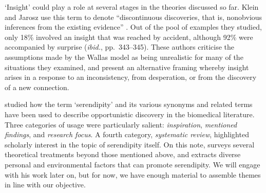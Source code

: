 `Insight' could play a role at several stages in the theories
discussed so far.  Klein and Jarosz use this term to denote
``discontinuous discoveries, that is, nonobvious inferences from the
existing evidence'' \cite[p.~335]{Klein2011}.  Out of the pool of
examples they studied, only 18\% involved an insight that was reached
by accident, although 92\% were accompanied by surprise (\emph{ibid.},
pp.~343--345).  These authors criticise the assumptions made by the
Wallas model as being unrealistic for many of the situations they
examined, and present an alternative framing whereby insight arises in
a response to an inconsistency, from desperation, or from the
discovery of a new connection.

\citet{Allen:2013:LOD:2655780.2655790} studied how the term
`serendipity' and its various synonyms and related terms have been
used to describe opportunistic discovery in the biomedical literature.
Three categories of usage were particularly salient:
\emph{inspiration}, \emph{mentioned findings}, and \emph{research
  focus}.  A fourth category, \emph{systematic review}, highlighted
scholarly interest in the topic of serendipity itself.
On this note, \citet{bjorneborn2017three} surveys several theoretical
treatments beyond those mentioned above, and extracts diverse personal
and environmental factors that can promote serendipity.  We will
engage with his work later on, but for now, we have enough material to
assemble themes in line with our objective.


